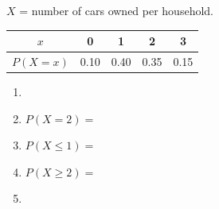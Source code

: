 \documentclass[10pt]{article}
\begin{document}
\vspace{0.1in}

\begin{practicebox}
\small
$X$ = number of cars owned per household.
\begin{center}
\renewcommand{\arraystretch}{1.3}
\begin{tabular}{@{}ccccc@{}}
$x$ & 0 & 1 & 2 & 3 \\
\hline
$P(X=x)$ & 0.10 & 0.40 & 0.35 & 0.15 \\
\end{tabular}
\end{center}
\begin{enumerate}[leftmargin=1.5em, itemsep=8pt]
  \item {}
  \item $P(X = 2) = $ 
  \item $P(X \le 1) = $ 
  \item $P(X \ge 2) = $ 
  \item {}
\end{enumerate}
\end{practicebox}
\end{document}

